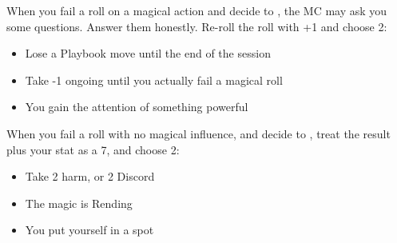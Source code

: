 



\begin{multicols}{3}
  \begin{move}
    When you fail a roll on a magical action and decide to , the MC may ask you some
    questions. Answer them honestly. Re-roll the roll with +1 and choose
    2:
    \begin{itemize}
      \setlength\itemsep{0em}
    \item Lose a Playbook move until the end of the session
    \item Take -1 ongoing until you actually fail a magical roll
    \item You gain the attention of something powerful
    \end{itemize}
  \end{move}

  \SEPARATOR
  
  \begin{move}
    When you fail a roll with no magical influence, and decide to
    , treat the result plus your stat as a
    7, and choose 2:
    \begin{itemize}
      \setlength\itemsep{0em}
    \item Take 2 harm, or 2 Discord
    \item The magic is Rending
    \item You put yourself in a spot
    \end{itemize}
  \end{move}

  \SEPARATOR


\end{multicols}
